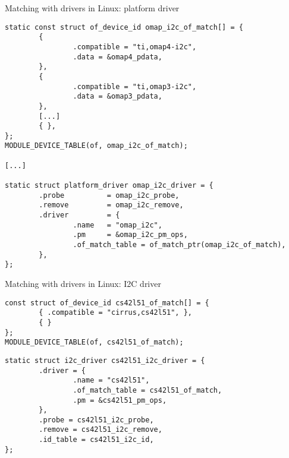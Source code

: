\begin{frame}[fragile]{Matching with drivers in Linux: platform driver}
  \begin{block}{}
    {\tiny
\begin{verbatim}
static const struct of_device_id omap_i2c_of_match[] = {
        {
                .compatible = "ti,omap4-i2c",
                .data = &omap4_pdata,
        },
        {
                .compatible = "ti,omap3-i2c",
                .data = &omap3_pdata,
        },
        [...]
        { },
};
MODULE_DEVICE_TABLE(of, omap_i2c_of_match);

[...]

static struct platform_driver omap_i2c_driver = {
        .probe          = omap_i2c_probe,
        .remove         = omap_i2c_remove,
        .driver         = {
                .name   = "omap_i2c",
                .pm     = &omap_i2c_pm_ops,
                .of_match_table = of_match_ptr(omap_i2c_of_match),
        },
};
\end{verbatim}
    }
  \end{block}
\end{frame}

\begin{frame}[fragile]{Matching with drivers in Linux: I2C driver}
  \begin{block}{}
    {\tiny
\begin{verbatim}
const struct of_device_id cs42l51_of_match[] = {
        { .compatible = "cirrus,cs42l51", },
        { }
};
MODULE_DEVICE_TABLE(of, cs42l51_of_match);
\end{verbatim}
    }
  \end{block}
  \begin{block}{}
    {\tiny
\begin{verbatim}
static struct i2c_driver cs42l51_i2c_driver = {
        .driver = {
                .name = "cs42l51",
                .of_match_table = cs42l51_of_match,
                .pm = &cs42l51_pm_ops,
        },
        .probe = cs42l51_i2c_probe,
        .remove = cs42l51_i2c_remove,
        .id_table = cs42l51_i2c_id,
};
\end{verbatim}
    }
  \end{block}
\end{frame}


